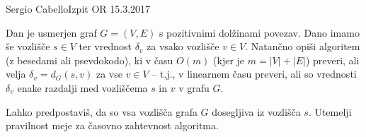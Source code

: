 \begin{naloga}{Sergio Cabello}{Izpit OR 15.3.2017}
\begin{vprasanje}
Dan je usmerjen graf $G = (V, E)$ s pozitivnimi dolžinami povezav.
Dano imamo še vozlišče $s \in V$
ter vrednost $\delta_v$ za vsako vozlišče $v \in V$.
Natančno opiši algoritem (z besedami ali psevdokodo),
ki v času $O(m)$ (kjer je $m = |V| + |E|$) preveri,
ali velja $\delta_v = d_G(s, v)$ za vse $v \in V$
-- t.j., v linearnem času preveri,
ali so vrednosti $\delta_v$
enake razdalji med vozliščema $s$ in $v$ v grafu $G$.

Lahko predpostaviš, da so vsa vozlišča grafa $G$ dosegljiva iz vozlišča $s$.
Utemelji pravilnost meje za časovno zahtevnost algoritma.
\end{vprasanje}
\begin{odgovor}
\end{odgovor}
\end{naloga}
